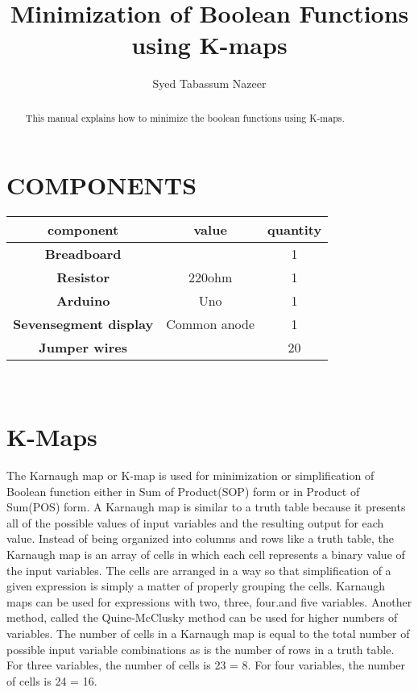 \documentclass{article}
\title{\textbf{Minimization of Boolean Functions using K-maps}}
\author{Syed Tabassum Nazeer}
\begin{document}
\maketitle
\begin{tableofcontents}
\begin{abstract}
This manual explains how to minimize the boolean functions using K-maps.
\end{abstract}
\section{COMPONENTS}
\begin{tabular}{|c||c||c|}
\hline
\textbf{component} & {value} & {quantity} \\
\hline
 \textbf{Breadboard}  &  &  1  \\
 \hline
 \textbf{Resistor}  & {220ohm} & {1} \\
 \hline
 \textbf{Arduino} & {Uno} & 1\\
 \hline
 \textbf{Sevensegment display} & {Common anode} & {1}\\
 \hline
 \textbf{Jumper wires} &   &  {20}\\
 \hline
\end{tabular}
\\
\section{K-Maps}
The Karnaugh map or K-map is used for minimization or simplification of Boolean function either in Sum of Product(SOP) form or in Product of Sum(POS) form. A Karnaugh map is similar to a truth table because it presents all of the possible values of input variables and the resulting output for each value. Instead of being organized into columns and rows like a truth table, the Karnaugh map is an array of cells in which each cell represents a binary value of the input variables. The cells are arranged in a way so that simplification of a given expression is simply a matter of properly grouping the cells. Karnaugh maps can be used for expressions with two, three, four.and five variables. Another method, called the Quine-McClusky method can be used for higher numbers of variables. The number of cells in a Karnaugh map is equal to the total number of possible input variable combinations as is the number of rows in a truth table. For three variables, the number of cells is 23 = 8. For four variables, the number of cells is 24 = 16.

\end{tableofcontents}
\end{document}
